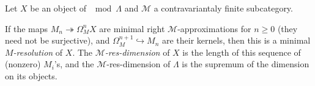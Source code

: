 \begin{defn}
	Let $X$ be an object of $\mod\Lambda$ and $\mathcal M$ a contravariantaly finite subcategory.
	\begin{center}
	\end{center}
	If the maps $M_n \twoheadrightarrow \Omega_M^nX$ are minimal right $\mathcal M$-approximations for $n\geq 0$ (they need not be surjective), and $\Omega_M^{n+1} \hookrightarrow M_n$ are their kernels, then this is a minimal \emph{$M$-resolution} of $X$. The \emph{$\mathcal M$-res-dimension} of $X$ is the length of this sequence of (nonzero) $M_i$'s, and the $\mathcal M$-res-dimension of $\Lambda$ is the supremum of the dimension on its objects.

\end{defn}

